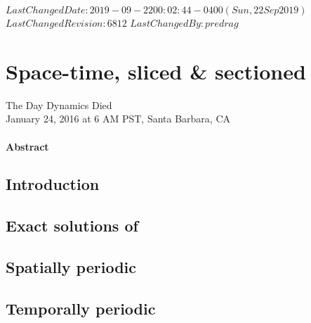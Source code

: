 {$LastChangedDate: 2019-09-22 00:02:44 -0400 (Sun, 22 Sep 2019) $}
{$LastChangedRevision: 6812 $} {$LastChangedBy: predrag $}

\chapter{Space-time, sliced \& sectioned}
\label{chap:spatiotemp}
\begin{bartlett}{
{The Day Dynamics Died}
\\
January 24, 2016 at 6 AM PST, Santa Barbara, CA
                }
\end{bartlett}

\subsubsection*{Abstract}


\section{Introduction}
\label{sect:intro}


\section{\KSe}
\label{sect:KSe}


\section{Exact solutions of \KS}
\label{sect:KSsols}


\section{Spatially periodic \KS}
\label{sect:KStimeInt}


\section{Temporally periodic \KS}
\label{sect:KSspaceInt}


